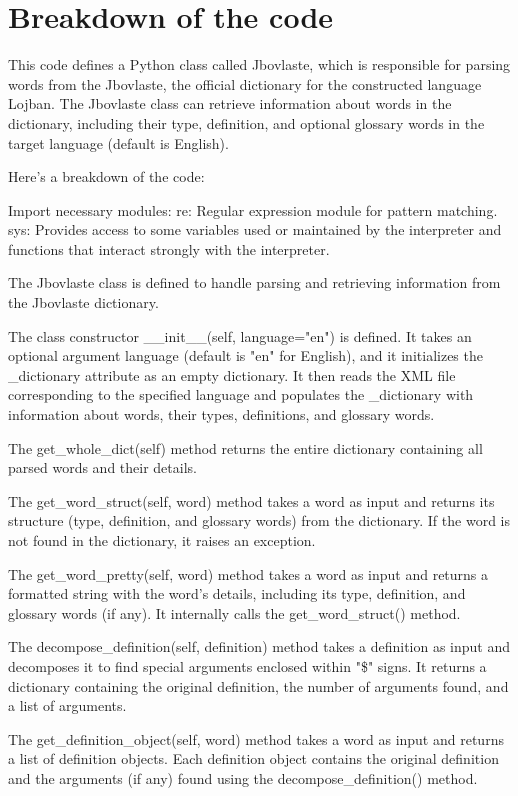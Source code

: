 \section{Breakdown of the code}

This code defines a Python class called Jbovlaste, which is responsible for parsing words from the Jbovlaste, the official dictionary for the constructed language Lojban. The Jbovlaste class can retrieve information about words in the dictionary, including their type, definition, and optional glossary words in the target language (default is English).

Here's a breakdown of the code:

    Import necessary modules:
        re: Regular expression module for pattern matching.
        sys: Provides access to some variables used or maintained by the interpreter and functions that interact strongly with the interpreter.

    The Jbovlaste class is defined to handle parsing and retrieving information from the Jbovlaste dictionary.

    The class constructor \_\_init\_\_(self, language="en") is defined. It takes an optional argument language (default is "en" for English), and it initializes the \_dictionary attribute as an empty dictionary. It then reads the XML file corresponding to the specified language and populates the \_dictionary with information about words, their types, definitions, and glossary words.

    The get\_whole\_dict(self) method returns the entire dictionary containing all parsed words and their details.

    The get\_word\_struct(self, word) method takes a word as input and returns its structure (type, definition, and glossary words) from the dictionary. If the word is not found in the dictionary, it raises an exception.

    The get\_word\_pretty(self, word) method takes a word as input and returns a formatted string with the word's details, including its type, definition, and glossary words (if any). It internally calls the get\_word\_struct() method.

    The decompose\_definition(self, definition) method takes a definition as input and decomposes it to find special arguments enclosed within "\$" signs. It returns a dictionary containing the original definition, the number of arguments found, and a list of arguments.

    The get\_definition\_object(self, word) method takes a word as input and returns a list of definition objects. Each definition object contains the original definition and the arguments (if any) found using the decompose\_definition() method.

